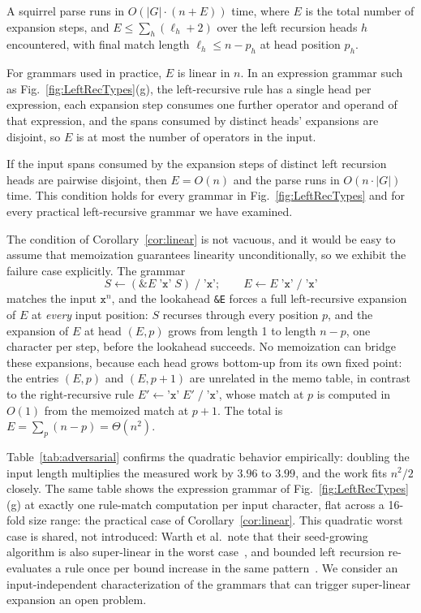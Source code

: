 \documentclass[manuscript]{acmart}
\newcommand{\cd}[1]{\texttt{#1}}
\begin{document}
\begin{theorem}
\label{thm:general}
A squirrel parse runs in $O(|G| \cdot (n + E))$ time, where $E$ is the total number of expansion steps, and $E \leq \sum_{h} (\ell_h + 2)$ over the left recursion heads $h$ encountered, with final match length $\ell_h \leq n - p_h$ at head position $p_h$.
\end{theorem}

For grammars used in practice, $E$ is linear in $n$. In an expression grammar such as Fig.~\ref{fig:LeftRecTypes}(g), the left-recursive rule has a single head per expression, each expansion step consumes one further operator and operand of that expression, and the spans consumed by distinct heads' expansions are disjoint, so $E$ is at most the number of operators in the input.

\begin{corollary}
\label{cor:linear}
If the input spans consumed by the expansion steps of distinct left recursion heads are pairwise disjoint, then $E = O(n)$ and the parse runs in $O(n \cdot |G|)$ time. This condition holds for every grammar in Fig.~\ref{fig:LeftRecTypes} and for every practical left-recursive grammar we have examined.
\end{corollary}

The condition of Corollary~\ref{cor:linear} is not vacuous, and it would be easy to assume that memoization guarantees linearity unconditionally, so we exhibit the failure case explicitly. The grammar
\[
S \leftarrow (\texttt{\&}E \; \texttt{'x'} \; S) \; / \; \texttt{'x'}; \qquad E \leftarrow E \; \texttt{'x'} \; / \; \texttt{'x'}
\]
matches the input $\texttt{x}^n$, and the lookahead \cd{\&E} forces a full left-recursive expansion of $E$ at \emph{every} input position: $S$ recurses through every position $p$, and the expansion of $E$ at head $(E, p)$ grows from length 1 to length $n - p$, one character per step, before the lookahead succeeds. No memoization can bridge these expansions, because each head grows bottom-up from its own fixed point: the entries $(E, p)$ and $(E, p{+}1)$ are unrelated in the memo table, in contrast to the right-recursive rule $E' \leftarrow \texttt{'x'} \; E' \; / \; \texttt{'x'}$, whose match at $p$ is computed in $O(1)$ from the memoized match at $p + 1$. The total is $E = \sum_{p} (n - p) = \Theta(n^2)$.

Table~\ref{tab:adversarial} confirms the quadratic behavior empirically: doubling the input length multiplies the measured work by $3.96$ to $3.99$, and the work fits $n^2/2$ closely. The same table shows the expression grammar of Fig.~\ref{fig:LeftRecTypes}(g) at exactly one rule-match computation per input character, flat across a 16-fold size range: the practical case of Corollary~\ref{cor:linear}. This quadratic worst case is shared, not introduced: Warth et al.\ note that their seed-growing algorithm is also super-linear in the worst case~\cite{warth2008}, and bounded left recursion re-evaluates a rule once per bound increase in the same pattern~\cite{medeiros2014}. We consider an input-independent characterization of the grammars that can trigger super-linear expansion an open problem.
\end{document}
